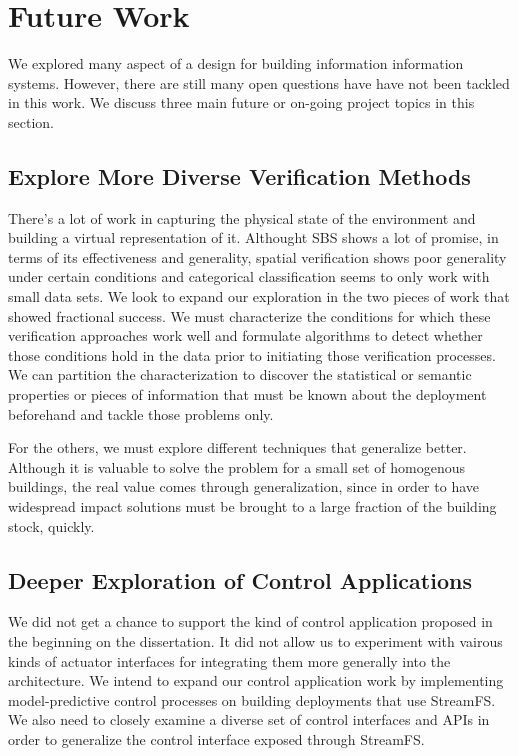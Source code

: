\section{Future Work}

We explored many aspect of a design for building information information systems.  However, there are still many open questions have
have not been tackled in this work.  We discuss three main future or on-going project topics in this section.

\subsection{Explore More Diverse Verification Methods}
There's a lot of work in capturing the physical state of the environment and building a virtual representation of it.
Althought SBS shows a lot of promise, in terms of its effectiveness and generality, spatial verification shows poor generality 
under certain conditions and categorical classification seems to only work with small data sets.  We look to expand our 
exploration in the two pieces of work that showed fractional success.  We must characterize the conditions for which these
verification approaches work well and formulate algorithms to detect whether those conditions hold in the data prior to
initiating those verification processes.  We can partition the characterization to discover the statistical or semantic 
properties or pieces of information that must be known about the deployment beforehand and tackle those problems only.

For the others, we must explore different techniques that generalize better.  Although it is valuable to solve the problem for
a small set of homogenous buildings, the real value comes through generalization, since in order to have widespread impact
solutions must be brought to a large fraction of the building stock, quickly.



\subsection{Deeper Exploration of Control Applications}
We did not get a chance to support the kind of control application proposed in the beginning on the dissertation.  It did not
allow us to experiment with vairous kinds of actuator interfaces for integrating them more generally into the architecture.
We intend to expand our control application work by implementing model-predictive control processes on building deployments
that use StreamFS.  We also need to closely examine a diverse set of control interfaces and APIs in order to generalize
the control interface exposed through StreamFS.

